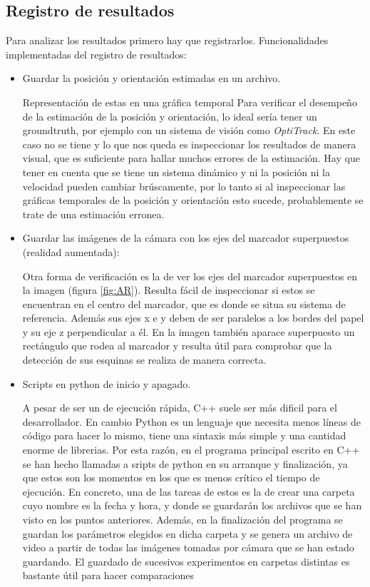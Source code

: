 \subsection{Registro de resultados}
Para analizar los resultados primero hay que registrarlos.
Funcionalidades implementadas del registro de resultados:
\begin{itemize}
\item Guardar la posición y orientación estimadas en un archivo. 

	Representación de estas en una gráfica temporal
	Para verificar el desempeño de la estimación de la posición y orientación, lo ideal sería tener un groundtruth, por ejemplo con un sistema de visión como \textit{OptiTrack}. En este caso no se tiene y lo que nos queda es inspeccionar los resultados de manera visual, que es suficiente para hallar muchos errores de la estimación. Hay que tener en cuenta que se tiene un sistema dinámico y ni la posición ni la velocidad pueden cambiar brúscamente, por lo tanto si al inspeccionar las gráficas temporales de la posición y orientación esto sucede, probablemente se trate de una estimación erronea. 

\item Guardar las imágenes de la cámara con los ejes del marcador superpuestos (realidad aumentada):

	Otra forma de verificación es la de ver los ejes del marcador superpuestos en la imagen (figura \ref{fig:AR}). Resulta fácil de inspeccionar si estos se encuentran en el centro del marcador, que es donde se situa su sistema de referencia. Además sus ejes x e y deben de ser paralelos a los bordes del papel y su eje z perpendicular a él. En la imagen también aparace superpuesto un rectángulo que rodea al marcador y resulta útil para comprobar que la detección de sus esquinas se realiza de manera correcta.  
	\figAR

\item Scripts en python de inicio y apagado.

	A pesar de ser un de ejecución rápida, C++ suele ser más dificil para el desarrollador. En cambio Python es un lenguaje que necesita menos líneas de código para hacer lo mismo, tiene una sintaxis más simple y una cantidad enorme de librerias. 
	Por esta razón, en el programa principal escrito en C++ se han hecho llamadas a sripts de python en su arranque y finalización, ya que estos son los momentos en los que es menos crítico el tiempo de ejecución. 
	En concreto, una de las tareas de estos es la de crear una carpeta cuyo nombre es la fecha y hora, y donde se guardarán los archivos que se han visto en los puntos anteriores. Además, en la finalización del programa se guardan los parámetros elegidos en dicha carpeta y se genera un archivo de video a partir de todas las imágenes tomadas por cámara que se han estado guardando.
	El guardado de sucesivos experimentos en carpetas distintas es bastante útil para hacer comparaciones
\end{itemize}

